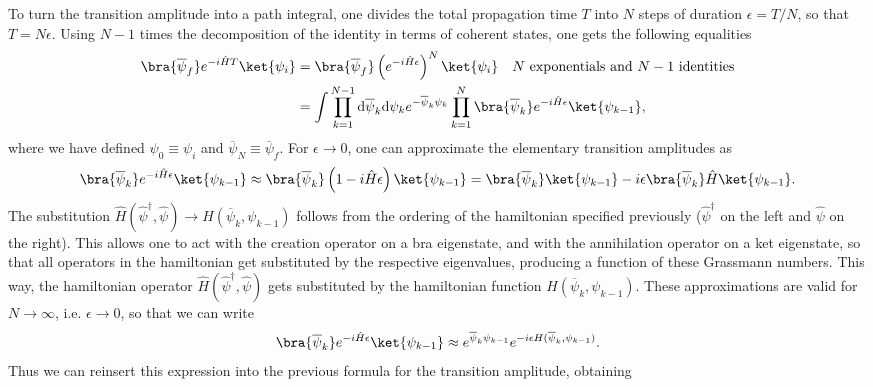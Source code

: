 To turn the transition amplitude into a path integral, one divides the total propagation time \(T\) into \(N\) steps of duration \(\epsilon = T / N\), so that \(T = N\epsilon\). Using \(N-1\) times the decomposition of the identity in terms of coherent states, one gets the following equalities
\[
    \begin{aligned}
        \bra{\overline{\psi}_f} e^{-i \hat{H} T} \ket{\psi_i} & = \bra{\overline{\psi}_f} \left( e^{-i \hat{H} \epsilon} \right)^N \ket{\psi_i} \quad N \text{ exponentials and } N-1 \text{ identities}                                                  \\
                                                              & = \int \prod_{k=1}^{N-1} \mathrm{d} \overline{\psi}_k \mathrm{d} \psi_k e^{-\overline{\psi}_k \psi_k} \prod_{k=1}^{N} \bra{\overline{\psi}_{k}} e^{-i \hat{H} \epsilon} \ket{\psi_{k-1}}, \\
    \end{aligned}
\]
where we have defined \(\psi_0 \equiv \psi_i\) and \(\overline{\psi}_N \equiv \overline{\psi}_f\). For \(\epsilon \to 0\), one can approximate the elementary transition amplitudes as
\[
    \bra{\overline{\psi}_{k}} e^{-i \hat{H} \epsilon} \ket{\psi_{k-1}} \approx \bra{\overline{\psi}_{k}} \left( 1 - i \hat{H} \epsilon \right) \ket{\psi_{k-1}} = \bra{\overline{\psi}_{k}} \ket{\psi_{k-1}} - i \epsilon \bra{\overline{\psi}_{k}} \hat{H} \ket{\psi_{k-1}}.
\]
The substitution \(\hat{H}(\hat{\psi}^\dagger, \hat{\psi}) \to H(\overline{\psi}_k, \psi_{k-1})\) follows from the ordering of the hamiltonian specified previously (\(\hat{\psi}^\dagger\) on the left and \(\hat{\psi}\) on the right). This allows one to act with the creation operator on a bra eigenstate, and with the annihilation operator on a ket eigenstate, so that all operators in the hamiltonian get substituted by the respective eigenvalues, producing a function of these Grassmann numbers. This way, the hamiltonian operator \(\hat{H}(\hat{\psi}^\dagger, \hat{\psi})\) gets substituted by the hamiltonian function \(H(\overline{\psi}_k, \psi_{k-1})\). These approximations are valid for \(N \to \infty\), i.e. \(\epsilon \to 0\), so that we can write
\[
    \bra{\overline{\psi}_{k}} e^{-i \hat{H} \epsilon} \ket{\psi_{k-1}} \approx e^{\overline{\psi}_k \psi_{k-1}} e^{- i \epsilon H(\overline{\psi}_k, \psi_{k-1})}.
\]
Thus we can reinsert this expression into the previous formula for the transition amplitude, obtaining
